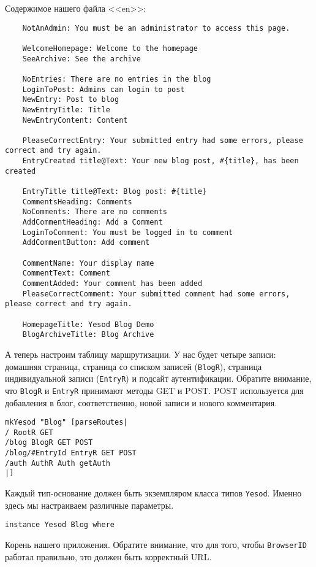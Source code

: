 Содержимое нашего файла <<en>>: 

\begin{lstlisting}
    NotAnAdmin: You must be an administrator to access this page.

    WelcomeHomepage: Welcome to the homepage
    SeeArchive: See the archive

    NoEntries: There are no entries in the blog
    LoginToPost: Admins can login to post
    NewEntry: Post to blog
    NewEntryTitle: Title
    NewEntryContent: Content

    PleaseCorrectEntry: Your submitted entry had some errors, please correct and try again.
    EntryCreated title@Text: Your new blog post, #{title}, has been created

    EntryTitle title@Text: Blog post: #{title}
    CommentsHeading: Comments
    NoComments: There are no comments
    AddCommentHeading: Add a Comment
    LoginToComment: You must be logged in to comment
    AddCommentButton: Add comment

    CommentName: Your display name
    CommentText: Comment
    CommentAdded: Your comment has been added
    PleaseCorrectComment: Your submitted comment had some errors, please correct and try again.

    HomepageTitle: Yesod Blog Demo
    BlogArchiveTitle: Blog Archive
\end{lstlisting}

А теперь настроим таблицу маршрутизации. У нас будет четыре записи: домашняя страница, страница со списком записей (\lstinline!BlogR!), страница индивидуальной записи (\lstinline!EntryR!) и подсайт аутентификации. Обратите внимание, что \lstinline!BlogR! и \lstinline!EntryR! принимают методы GET и POST. POST используется для добавления в блог, соответственно, новой записи и нового комментария.
 
\begin{lstlisting}
mkYesod "Blog" [parseRoutes|
/ RootR GET
/blog BlogR GET POST
/blog/#EntryId EntryR GET POST
/auth AuthR Auth getAuth
|]
\end{lstlisting}
 
Каждый тип-основание должен быть экземпляром класса типов \lstinline!Yesod!. Именно здесь мы настраиваем различные параметры.
 
\begin{lstlisting}
instance Yesod Blog where
\end{lstlisting}

Корень нашего приложения. Обратите внимание, что для того, чтобы \lstinline!BrowserID! работал правильно, это должен быть корректный URL.
 
